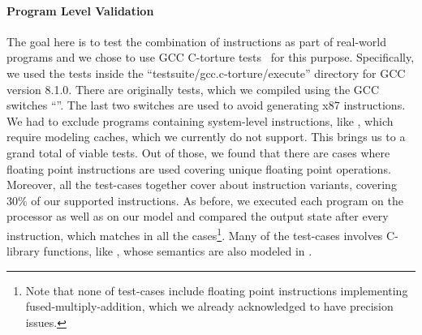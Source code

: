 \paragraph{Program Level Validation}
The goal here is to test the combination of instructions as part of real-world programs and we chose to use GCC C-torture tests~\cite{CTORTURE} for this purpose. Specifically, we used the tests inside the ``testsuite/gcc.c-torture/execute'' directory for GCC version 8.1.0.  
There are originally \TortureTotal{} tests, which we compiled using  the GCC switches ``''. The last two switches are used to avoid generating x87 instructions. We had to exclude \TortureExclude{} programs containing system-level instructions, like , which require modeling caches, which we currently do not support. This brings us to a grand total of \TortureInclude{} viable tests. Out of those, we found that there are \TortureUifsInstr{} cases where floating point instructions are used covering \TortureUifs{} unique floating point operations. Moreover, all the test-cases together cover about \TortureCoverage{} instruction variants, covering  $30\%$ of our supported instructions. As before, we executed each program on the processor as well as  on our model and compared the output state after every instruction, which matches in all the cases\footnote{Note that none of test-cases include floating point instructions implementing fused-multiply-addition, which we already acknowledged to have precision issues.}. Many of the test-cases involves C-library functions, like , whose semantics are also modeled in \K.


